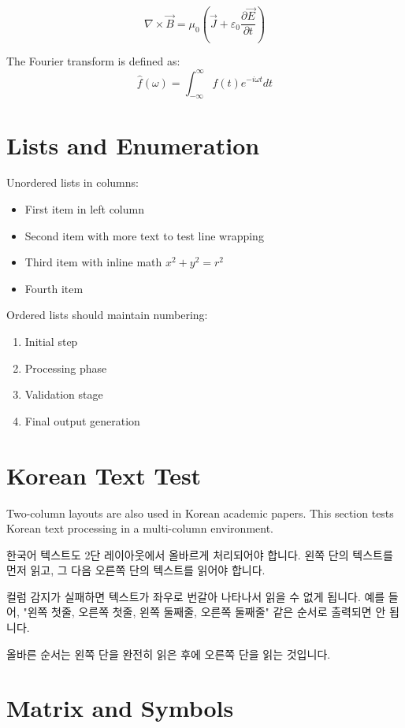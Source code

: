 \documentclass[10pt,twocolumn]{article}
\begin{document}
\begin{equation}
\nabla \times \vec{B} = \mu_0 \left(\vec{J} + \varepsilon_0 \frac{\partial \vec{E}}{\partial t}\right)
\end{equation}

The Fourier transform is defined as:
\begin{equation}
\hat{f}(\omega) = \int_{-\infty}^{\infty} f(t) e^{-i\omega t} dt
\end{equation}

\section{Lists and Enumeration}

Unordered lists in columns:
\begin{itemize}
\item First item in left column
\item Second item with more text to test line wrapping
\item Third item with inline math $x^2 + y^2 = r^2$
\item Fourth item
\end{itemize}

Ordered lists should maintain numbering:
\begin{enumerate}
\item Initial step
\item Processing phase
\item Validation stage
\item Final output generation
\end{enumerate}

\section{Korean Text Test}

Two-column layouts are also used in Korean academic papers. This section tests Korean text processing in a multi-column environment.

한국어 텍스트도 2단 레이아웃에서 올바르게 처리되어야 합니다. 왼쪽 단의 텍스트를 먼저 읽고, 그 다음 오른쪽 단의 텍스트를 읽어야 합니다.

컬럼 감지가 실패하면 텍스트가 좌우로 번갈아 나타나서 읽을 수 없게 됩니다. 예를 들어, "왼쪽 첫줄, 오른쪽 첫줄, 왼쪽 둘째줄, 오른쪽 둘째줄" 같은 순서로 출력되면 안 됩니다.

올바른 순서는 왼쪽 단을 완전히 읽은 후에 오른쪽 단을 읽는 것입니다.

\section{Matrix and Symbols}
\end{document}
